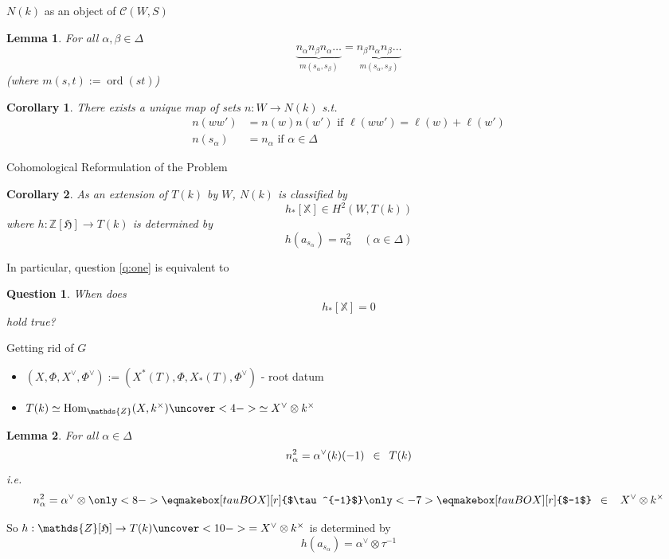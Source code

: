 \documentclass[pdf]{beamer}
\newcommand{\op}[1]{\operatorname{#1}}
\newcommand{\bbf}[1]{\mathds{#1}}
\newcommand{\Z}{\bbf{Z}}
\newcommand{\X}{\bbf{X}}
\newtheorem{question}{Question}
\newtheorem*{lemma*}{Lemma}
\newtheorem*{cor*}{Corollary}
\begin{document}
\begin{frame}{$N(k)$ as an object of $\mathcal{C}(W,S)$}
   \begin{lemma*}
      For all $\alpha, \beta \in \Delta$
      \[ \underbrace{n_\alpha n_\beta n_\alpha \dots}_{m(s_\alpha,s_\beta)} = \underbrace{n_\beta n_\alpha n_\beta \dots}_{m(s_\alpha, s_\beta)} \]
      \pause[2] (where $m(s,t) := \op{ord}(st)$)
   \end{lemma*}
   \pause[3]
   \begin{cor*}
      There exists a unique map of sets $n: W \rightarrow N(k)$ s.t.
      \begin{align*} n(ww') & = n(w)n(w') \text{ if } \ell(ww') = \ell(w)+\ell(w') \\
         n(s_\alpha) & = n_\alpha \text{ if } \alpha \in \Delta
\end{align*}
   \end{cor*}
\end{frame}

\begin{frame}{Cohomological Reformulation of the Problem}
\begin{cor*}
   As an extension of $T(k)$ by $W$, $N(k)$ is classified by
   \[ h_\ast[\X] \in H^2(W,T(k)) \]
   \pause where $h:\Z[\mathfrak{H}] \rightarrow T(k)$ is determined by
   \[ h(a_{s_\alpha}) = n_\alpha^2 \quad (\alpha \in \Delta) \]
\end{cor*}
\pause In particular, question \ref{q:one} is equivalent to\pause
\begin{question}\label{q:two}
   When does
   \[ h_\ast[\X] = 0\]
   hold true?
\end{question}
\end{frame}

\begin{frame}{Getting rid of $G$}
   \pause \begin{itemize}
      \item<2-> $(X,\Phi,X^\vee,\Phi^\vee) := (X^\ast(T),\Phi,X_\ast(T),\Phi^\vee)$ - root datum
      \item<3-> $T(k) \simeq \op{Hom}_\Z(X,k^\times) \uncover<4->{\simeq X^\vee \otimes k^\times}$
   \end{itemize}
   \pause[5]
   \begin{lemma*}
      For all $\alpha \in \Delta$\uncover<6->{ (note $\alpha^\vee \in X_\ast(T)$ is a map $\bbf{G}_m \rightarrow T$)}
      \[ n_\alpha^2 = \alpha^\vee(k)(-1)\enskip \in\enskip T(k) \]
      \pause[7] i.e.
      \[ n_\alpha^2 = \alpha^\vee \otimes \only<8->{\eqmakebox[tauBOX][r]{$\tau^{-1}$}}\only<-7>{\eqmakebox[tauBOX][r]{$-1$}}\enskip \in\enskip \ X^\vee \otimes k^\times \]
   \end{lemma*}
   \pause[9] So $h:\Z[\mathfrak{H}] \rightarrow T(k) \uncover<10->{= X^\vee \otimes k^\times}$ \pause[11]is determined by\pause
   \[ h(a_{s_\alpha}) = \alpha^\vee \otimes \tau^{-1} \]
\end{frame}
\end{document}
